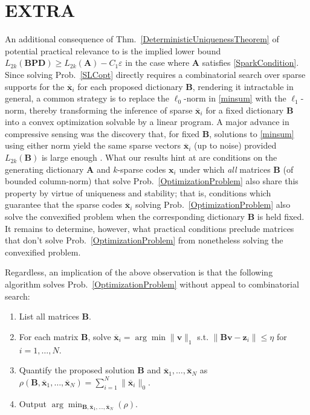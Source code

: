 \documentclass[journal, twocolumn]{IEEEtran}
\begin{document}
\section{EXTRA}
An additional consequence of Thm.~\ref{DeterministicUniquenessTheorem} of potential practical relevance to is the implied lower bound $L_{2k}(\mathbf{BPD}) \geq L_{2k}(\mathbf{A}) - C_1\varepsilon$ in the case where $\mathbf{A}$ satisfies \eqref{SparkCondition}. Since solving Prob.~\ref{SLCopt} directly requires a combinatorial search over sparse supports for the $\mathbf{\overline x}_i$ for each proposed dictionary $\mathbf{B}$, rendering it intractable in general, a common strategy is to replace the $\ell_0$-norm in \eqref{minsum} with the $\ell_1$-norm, thereby transforming the inference of sparse $\mathbf{\overline x}_i$ for a fixed dictionary $\mathbf{B}$ into a convex optimization solvable by a linear program. A major advance in compressive sensing was the discovery that, for fixed $\mathbf{B}$, solutions to \eqref{minsum} using either norm yield the same sparse vectors $\mathbf{\overline x}_i$ (up to noise) provided $L_{2k}(\mathbf{B})$ is large enough \cite{?}. What our results hint at are conditions on the generating dictionary $\mathbf{A}$ and $k$-sparse codes $\mathbf{x}_i$ under which \emph{all} matrices $\mathbf{B}$ (of bounded column-norm) that solve Prob.~\ref{OptimizationProblem} also share this property by virtue of uniqueness and stability; that is, conditions which guarantee that the sparse codes $\mathbf{\overline x}_i$ solving Prob.~\ref{OptimizationProblem} also solve the convexified problem when the corresponding dictionary $\mathbf{B}$ is held fixed. It remains to determine, however, what practical conditions preclude matrices that don't solve Prob.~\ref{OptimizationProblem} from nonetheless solving the convexified problem.

Regardless, an implication of the above observation is that the following algorithm solves Prob.~\ref{OptimizationProblem} without appeal to combinatorial search:
\begin{enumerate}
\item List all matrices $\mathbf{B}$.
\item For each matrix $\mathbf{B}$, solve $\mathbf{\overline x}_i = \arg \min \|\mathbf{v}\|_1$ s.t. $\|\mathbf{Bv} - \mathbf{z}_i\| \leq \eta$ for $i = 1, \ldots, N$.
\item Quantify the proposed solution $\mathbf{B}$ and $\mathbf{\overline x}_1, \ldots, \mathbf{\overline x}_N$ as $\rho(\mathbf{B}, \mathbf{\overline x}_1, \ldots, \mathbf{\overline x}_N) = \sum_{i=1}^{N} \|\mathbf{\overline x}_i\|_0$.
\item Output $\arg \min_{\mathbf{B}, \mathbf{\overline x}_1, \ldots, \mathbf{\overline x}_N} \left( \rho \right)$.
 \end{enumerate}
\end{document}
